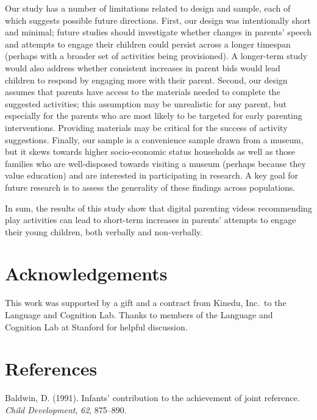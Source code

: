 \documentclass[man,floatsintext]{apa6}
\begin{document}
Our study has a number of limitations related to design and sample, each of which suggests possible future directions.
First, our design was intentionally short and minimal; future studies should investigate whether changes in parents' speech and attempts to engage their children could persist across a longer timespan (perhaps with a broader set of activities being provisioned).
A longer-term study would also address whether consistent increases in parent bids would lead children to respond by engaging more with their parent.
Second, our design assumes that parents have access to the materials needed to complete the suggested activities; this assumption may be unrealistic for any parent, but especially for the parents who are most likely to be targeted for early parenting interventions.
Providing materials may be critical for the success of activity suggestions.
Finally, our sample is a convenience sample drawn from a museum, but it skews towards higher socio-economic status households as well as those families who are well-disposed towards visiting a museum (perhaps because they value education) and are interested in participating in research.
A key goal for future research is to assess the generality of these findings across populations.

In sum, the results of this study show that digital parenting videos recommending play activities can lead to short-term increases in parents' attempts to engage their young children, both verbally and non-verbally.

\hypertarget{acknowledgements}{%
\section{Acknowledgements}\label{acknowledgements}}

This work was supported by a gift and a contract from Kinedu, Inc.~to the Language and Cognition Lab.
Thanks to members of the Language and Cognition Lab at Stanford for helpful discussion.

\newpage

\hypertarget{references}{%
\section{References}\label{references}}

\begingroup
\setlength{\parindent}{-0.5in}
\setlength{\leftskip}{0.5in}

\hypertarget{refs}{}
\leavevmode\hypertarget{ref-Baldwin1991}{}%
Baldwin, D. (1991). Infants' contribution to the achievement of joint reference. \emph{Child Development}, \emph{62}, 875--890.
\end{document}
